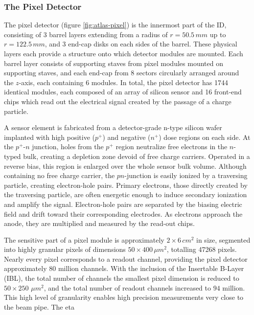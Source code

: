 \subsubsection{The Pixel Detector}
The pixel detector (figure \ref{fig:atlas-pixel}) is the innermost part of the ID, consisting of 3 barrel layers extending from a radius of $r=50.5\, mm$ up to $r=122.5\, mm$, and 3 end-cap disks on each sides of the barrel. These physical layers each provide a structure onto which detector modules are mounted. Each barrel layer consists of supporting staves  from pixel modules mounted on supporting staves, and each end-cap from 8 sectors circularly arranged around the $z$-axis, each containing 6 modules. In total, the pixel detector has 1744 identical modules, each composed of an array of silicon sensor and 16 front-end chips which read out the electrical signal created by the passage of a charge particle. \cite{front-end-chips} 

A sensor element is fabricated from a detector-grade n-type silicon wafer implanted with high positive ($p^+$) and negative ($n^+$) dose regions on each side. At the $p^+$-$n$ junction, holes from the $p^+$ region neutralize free electrons in the $n$-typed bulk, creating a depletion zone devoid of free charge carriers. Operated in a reverse bias, this region is enlarged over the whole sensor bulk volume. Although containing no free charge carrier, the $pn$-junction is easily ionized by a traversing particle, creating electron-hole pairs. Primary electrons, those directly created by the traversing particle, are often energetic enough to induce secondary ionization and amplify the signal. Electron-hole pairs are separated by the biasing electric field and drift toward their corresponding electrodes. As electrons approach the anode, they are multiplied and measured by the read-out chips.

The sensitive part of a pixel module is approximately $2\times 6\,cm^2$ in size, segmented into highly granular pixels of dimensions $50\times 400 \, \mu m^2$, totalling 47268 pixels. Nearly every pixel corresponds to a readout channel, providing the pixel detector approximately 80 million channels. With the inclusion of the Insertable B-Layer (IBL), the total number of channels the smallest pixel dimension is reduced to $50\times 250$ $\mu m^2$, and the total number of readout channels increased to $94$ million. This high level of granularity enables high precision measurements very close to the beam pipe. The eta

